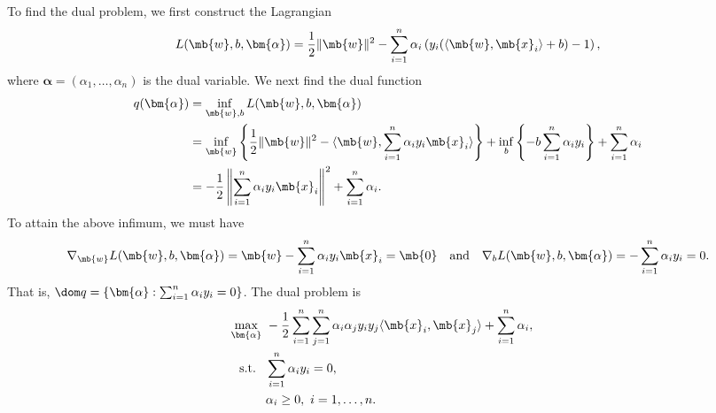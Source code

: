 \begin{exercise}
\begin{enumerate}
            \begin{solution}
                To find the dual problem, we first construct the Lagrangian
                \begin{align*}
                    L(\mb{w},b,\bm{\alpha}) = \frac{1}{2}\|\mb{w}\|^2 - \sum_{i=1}^n \alpha_i \left(y_i(\langle \mb{w}, \mb{x}_i \rangle + b) - 1\right),
                \end{align*}
                where $\bm{\alpha} = (\alpha_1, \ldots, \alpha_n)$ is the dual variable. We next find the dual function
                \begin{align*}
                    q(\bm{\alpha}) & = \inf_{\mb{w},b} L(\mb{w},b,\bm{\alpha})                                                                                                                                                        \\
                                   & = \inf_{\mb{w}} \left\{\frac{1}{2}\|\mb{w}\|^2 - \langle \mb{w}, \sum_{i=1}^n \alpha_i y_i\mb{x}_i \rangle \right\} + \inf_b \left\{-b \sum_{i=1}^n \alpha_i y_i \right\}+ \sum_{i=1}^n \alpha_i \\
                                   & = -\frac{1}{2} \left\|\sum_{i=1}^n \alpha_i y_i\mb{x}_i \right\|^2 + \sum_{i=1}^n \alpha_i.
                \end{align*}
                To attain the above infimum, we must have
                \begin{align*}
                    \nabla_{\mb{w}} L(\mb{w},b,\bm{\alpha}) = \mb{w} - \sum_{i=1}^n \alpha_i y_i \mb{x}_i = \mb{0} \quad \text{and} \quad \nabla_b L(\mb{w},b,\bm{\alpha}) = -\sum_{i=1}^n \alpha_i y_i = 0.
                \end{align*}
                That is, $\dom q = \left\{\bm{\alpha}: \sum_{i=1}^n \alpha_i y_i = 0 \right\}$. The dual problem is
                \begin{align*}
                    \max_{\bm{\alpha}} \  & - \frac{1}{2} \sum_{i=1}^n \sum_{j=1}^n \alpha_i \alpha_j y_i y_j \langle \mb{x}_i, \mb{x}_j \rangle + \sum_{i=1}^n \alpha_i, & \\
                    \text{ s.t. }      \  & \sum_{i=1}^n \alpha_i y_i = 0,                                                                                                & \\
                                          & \alpha_i \ge 0,\ i = 1, \ldots, n.                                                                                            &
                \end{align*}

\end{solution}
\end{enumerate}
\end{exercise}
